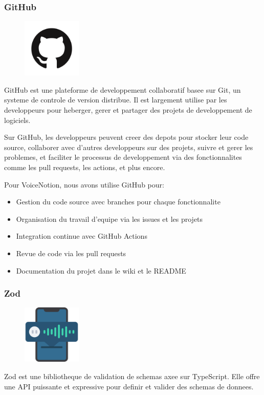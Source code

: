 \subsubsection{GitHub}
\begin{figure}
    \centering
    \includegraphics[width=0.25\textwidth]{assets/docs/github.png}
\end{figure}
GitHub est une plateforme de developpement collaboratif basee sur Git, un systeme de controle de version distribue. Il est largement utilise par les developpeurs pour heberger, gerer et partager des projets de developpement de logiciels.

Sur GitHub, les developpeurs peuvent creer des depots pour stocker leur code source, collaborer avec d'autres developpeurs sur des projets, suivre et gerer les problemes, et faciliter le processus de developpement via des fonctionnalites comme les pull requests, les actions, et plus encore.

Pour VoiceNotion, nous avons utilise GitHub pour:
\begin{itemize}
    \item Gestion du code source avec branches pour chaque fonctionnalite
    \item Organisation du travail d'equipe via les issues et les projets
    \item Integration continue avec GitHub Actions
    \item Revue de code via les pull requests
    \item Documentation du projet dans le wiki et le README
\end{itemize}



\subsubsection{Zod}
\begin{figure}
    \centering
    \includegraphics[width=0.25\textwidth]{assets/docs/logo_zod.png}
\end{figure}
Zod est une bibliotheque de validation de schemas axee sur TypeScript. Elle offre une API puissante et expressive pour definir et valider des schemas de donnees. 

